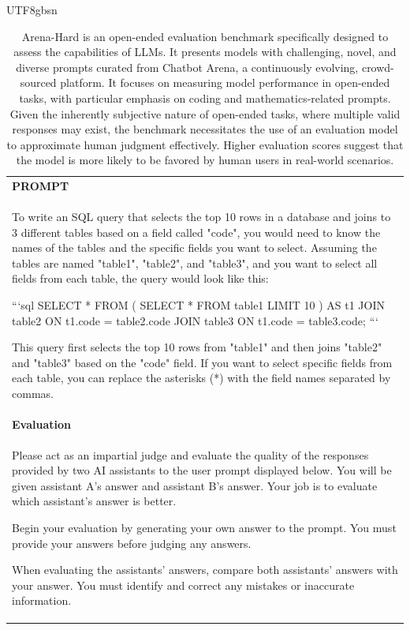 \documentclass[11pt, a4paper, logo, copyright, nonumbering]{deepseek}
\begin{document}
\begin{CJK*}{UTF8}{gbsn}
\begin{table}[h]
    \centering \small
        \caption{Arena-Hard is an open-ended evaluation benchmark specifically designed to assess the capabilities of LLMs. It presents models with challenging, novel, and diverse prompts curated from Chatbot Arena, a continuously evolving, crowd-sourced platform. It focuses on measuring model performance in open-ended tasks, with particular emphasis on coding and mathematics-related prompts.
        Given the inherently subjective nature of open-ended tasks, where multiple valid responses may exist, the benchmark necessitates the use of an evaluation model to approximate human judgment effectively. Higher evaluation scores suggest that the model is more likely to be favored by human users in real-world scenarios.   }
    \label{tab:arenahard_eval_format_example}
    \begin{tabular}{p{}}
    \hline
    \textbf{PROMPT}\\
    To write an SQL query that selects the top 10 rows in a database and joins to 3 different tables based on a field called "code", you would need to know the names of the tables and the specific fields you want to select. Assuming the tables are named "table1", "table2", and "table3", and you want to select all fields from each table, the query would look like this:

```sql
SELECT *
FROM (
  SELECT * 
  FROM table1
  LIMIT 10
) AS t1
JOIN table2 ON t1.code = table2.code
JOIN table3 ON t1.code = table3.code;
```

This query first selects the top 10 rows from "table1" and then joins "table2" and "table3" based on the "code" field. If you want to select specific fields from each table, you can replace the asterisks (*) with the field names separated by commas.\\ \hline
      \textbf{Evaluation}\\
      Please act as an impartial judge and evaluate the quality of the responses provided by two AI assistants to the user prompt displayed below. You will be given assistant A's answer and assistant B's answer. Your job is to evaluate which assistant's answer is better.

Begin your evaluation by generating your own answer to the prompt. You must provide your answers before judging any answers.

When evaluating the assistants' answers, compare both assistants' answers with your answer. You must identify and correct any mistakes or inaccurate information.


\end{tabular}
\end{table}
\end{CJK*}
\end{document}
